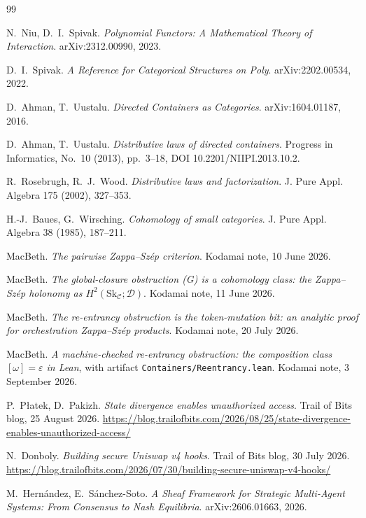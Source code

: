 \documentclass[11pt]{amsart}
\theoremstyle{definition}
\theoremstyle{remark}
\newcommand{\C}{\mathcal{C}}
\newcommand{\Sk}{\mathrm{Sk}}
\newcommand{\dir}{\mathcal{D}}
\begin{document}
\begin{thebibliography}{99}

 N.~Niu, D.~I.~Spivak. \emph{Polynomial Functors: A Mathematical Theory of
Interaction}. arXiv:2312.00990, 2023.

 D.~I.~Spivak. \emph{A Reference for Categorical Structures on \textup{Poly}}.
arXiv:2202.00534, 2022.

 D.~Ahman, T.~Uustalu. \emph{Directed Containers as Categories}.
arXiv:1604.01187, 2016.

 D.~Ahman, T.~Uustalu. \emph{Distributive laws of directed containers}.
Progress in Informatics, No.~10 (2013), pp.~3--18, DOI 10.2201/NIIPI.2013.10.2.

 R.~Rosebrugh, R.~J.~Wood. \emph{Distributive laws and factorization}.
J. Pure Appl. Algebra 175 (2002), 327--353.

 H.-J.~Baues, G.~Wirsching. \emph{Cohomology of small categories}. J. Pure
Appl. Algebra 38 (1985), 187--211.

 MacBeth. \emph{The pairwise Zappa--Sz\'ep criterion}. Kodamai note, 10 June 2026.

 MacBeth. \emph{The global-closure obstruction \textnormal{(G)} is a cohomology
class: the Zappa--Sz\'ep holonomy as $H^2(\Sk_\C;\dir)$}. Kodamai note, 11 June 2026.

 MacBeth. \emph{The re-entrancy obstruction is the token-mutation bit: an analytic
proof for orchestration Zappa--Sz\'ep products}. Kodamai note, 20 July 2026.

 MacBeth. \emph{A machine-checked re-entrancy obstruction: the composition class
$[\omega]=\varepsilon$ in Lean}, with artifact \texttt{Containers/Reentrancy.lean}. Kodamai note,
3 September 2026.

 P.~P\l atek, D.~Pakizh. \emph{State divergence enables unauthorized access}.
Trail of Bits blog, 25 August 2026.
\url{https://blog.trailofbits.com/2026/08/25/state-divergence-enables-unauthorized-access/}

 N.~Donboly. \emph{Building secure Uniswap v4 hooks}. Trail of Bits blog,
30 July 2026. \url{https://blog.trailofbits.com/2026/07/30/building-secure-uniswap-v4-hooks/}

 M.~Hern\'andez, E.~S\'anchez-Soto. \emph{A Sheaf Framework for Strategic
Multi-Agent Systems: From Consensus to Nash Equilibria}. arXiv:2606.01663, 2026.

\end{thebibliography}
\end{document}
